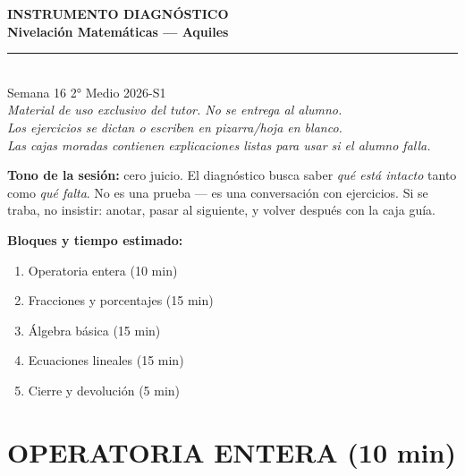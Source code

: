 \documentclass[11pt,a4paper]{article}
\begin{document}
\thispagestyle{empty}
\vspace*{2.5cm}
\begin{center}
  {\Huge\bfseries\color{azulprincipal} INSTRUMENTO DIAGNÓSTICO}\\[8pt]
  {\LARGE\bfseries\color{azuloscuro} Nivelación Matemáticas --- Aquiles}\\[15pt]
  {\color{azulprincipal}\rule{8cm}{2pt}}\\[15pt]
  {\Large Semana 16 \textbar{} 2° Medio \textbar{} 2026-S1}\\[25pt]
  {\itshape\color{gray}
  Material de uso exclusivo del tutor. No se entrega al alumno.\\[4pt]
  Los ejercicios se dictan o escriben en pizarra/hoja en blanco.\\[4pt]
  Las cajas moradas contienen explicaciones listas para usar si el alumno falla.}
\end{center}

\vspace{1.5cm}
\begin{tcolorbox}[recuerda]
\textbf{Tono de la sesión:} cero juicio. El diagnóstico busca saber \emph{qué está intacto} tanto como \emph{qué falta}. No es una prueba --- es una conversación con ejercicios. Si se traba, no insistir: anotar, pasar al siguiente, y volver después con la caja guía.
\end{tcolorbox}

\vspace{0.5cm}
\noindent\textbf{Bloques y tiempo estimado:}
\begin{enumerate}[leftmargin=2cm]
  \item Operatoria entera (10 min)
  \item Fracciones y porcentajes (15 min)
  \item Álgebra básica (15 min)
  \item Ecuaciones lineales (15 min)
  \item Cierre y devolución (5 min)
\end{enumerate}

\newpage

\section{OPERATORIA ENTERA (10 min)}
\end{document}
